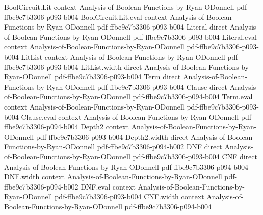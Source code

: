 \begin{lemma}
\label{BoolBLR.triple_expectation_eq_cube_fourier}
\leanok
{}
\proofstep
  {BoolCircuit.Lit}
  {context}
  {Analysis-of-Boolean-Functions-by-Ryan-ODonnell}
  {pdf-ffbe9c7b3306-p093-b004}
\proofstep
  {BoolCircuit.Lit.eval}
  {context}
  {Analysis-of-Boolean-Functions-by-Ryan-ODonnell}
  {pdf-ffbe9c7b3306-p093-b004}
\proofstep
  {Literal}
  {direct}
  {Analysis-of-Boolean-Functions-by-Ryan-ODonnell}
  {pdf-ffbe9c7b3306-p093-b004}
\proofstep
  {Literal.eval}
  {context}
  {Analysis-of-Boolean-Functions-by-Ryan-ODonnell}
  {pdf-ffbe9c7b3306-p093-b004}
\proofstep
  {LitList}
  {context}
  {Analysis-of-Boolean-Functions-by-Ryan-ODonnell}
  {pdf-ffbe9c7b3306-p093-b004}
\proofstep
  {LitList.width}
  {direct}
  {Analysis-of-Boolean-Functions-by-Ryan-ODonnell}
  {pdf-ffbe9c7b3306-p093-b004}
\proofstep
  {Term}
  {direct}
  {Analysis-of-Boolean-Functions-by-Ryan-ODonnell}
  {pdf-ffbe9c7b3306-p093-b004}
\proofstep
  {Clause}
  {direct}
  {Analysis-of-Boolean-Functions-by-Ryan-ODonnell}
  {pdf-ffbe9c7b3306-p094-b004}
\proofstep
  {Term.eval}
  {context}
  {Analysis-of-Boolean-Functions-by-Ryan-ODonnell}
  {pdf-ffbe9c7b3306-p093-b004}
\proofstep
  {Clause.eval}
  {context}
  {Analysis-of-Boolean-Functions-by-Ryan-ODonnell}
  {pdf-ffbe9c7b3306-p094-b004}
\proofstep
  {Depth2}
  {context}
  {Analysis-of-Boolean-Functions-by-Ryan-ODonnell}
  {pdf-ffbe9c7b3306-p093-b004}
\proofstep
  {Depth2.width}
  {direct}
  {Analysis-of-Boolean-Functions-by-Ryan-ODonnell}
  {pdf-ffbe9c7b3306-p094-b002}
\proofstep
  {DNF}
  {direct}
  {Analysis-of-Boolean-Functions-by-Ryan-ODonnell}
  {pdf-ffbe9c7b3306-p093-b004}
\proofstep
  {CNF}
  {direct}
  {Analysis-of-Boolean-Functions-by-Ryan-ODonnell}
  {pdf-ffbe9c7b3306-p094-b004}
\proofstep
  {DNF.width}
  {context}
  {Analysis-of-Boolean-Functions-by-Ryan-ODonnell}
  {pdf-ffbe9c7b3306-p094-b002}
\proofstep
  {DNF.eval}
  {context}
  {Analysis-of-Boolean-Functions-by-Ryan-ODonnell}
  {pdf-ffbe9c7b3306-p093-b004}
\proofstep
  {CNF.width}
  {context}
  {Analysis-of-Boolean-Functions-by-Ryan-ODonnell}
  {pdf-ffbe9c7b3306-p094-b004}

\end{lemma}

